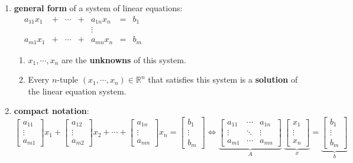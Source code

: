 \begin{enumerate}[itemsep=0.3cm]
    \item \textbf{general form} of a system of linear equations:
    \\
    \ \hfill
    $
        \begin{aligned}
            a_{11}x_1 & + & \cdots & + & a_{1n}x_n & = & b_1 \\
            & & & & \vdots \\
            a_{m1}x_1 & + & \cdots & + & a_{mn}x_n & = & b_m
        \end{aligned}
    $
    \hfill \cite{mfml/book/mml/Deisenroth-Faisal-Ong}
    \vspace{0.2cm}
    \begin{enumerate}
        \item $x_1, \cdots , x_n$ are the \textbf{unknowns} of this system.

        \item Every $n$-tuple $(x_1, \cdots , x_n) \in \mathbb{R}^n$ that satisfies this system is a \textbf{solution} of the linear equation system.
    \end{enumerate}


    \item \textbf{compact notation}:
    \\[0.2cm]
    $
        \begin{bmatrix}a_{11}\\ \vdots\\ a_{m1}\end{bmatrix} x_1 +
        \begin{bmatrix}a_{12}\\ \vdots\\ a_{m2}\end{bmatrix} x_2 +
        \cdots +
        \begin{bmatrix}a_{1n}\\ \vdots\\ a_{mn}\end{bmatrix} x_n =
        \begin{bmatrix}b_{1}\\ \vdots\\ b_{m}\end{bmatrix}
    \Longleftrightarrow
        \underset{A}{\underbrace{\begin{bmatrix}
            a_{11} & \cdots & a_{1n} \\
            \vdots & \ddots & \vdots \\
            a_{m1} & \cdots & a_{mn}
        \end{bmatrix}}} \
        \underset{x}{\underbrace{\begin{bmatrix} x_{1} \\ \vdots \\ x_{n} \end{bmatrix}}}
        =
        \underset{b}{\underbrace{\begin{bmatrix} b_{1} \\ \vdots \\ b_{m} \end{bmatrix}}}
    $
    \hfill \cite{mfml/book/mml/Deisenroth-Faisal-Ong}


\end{enumerate}
